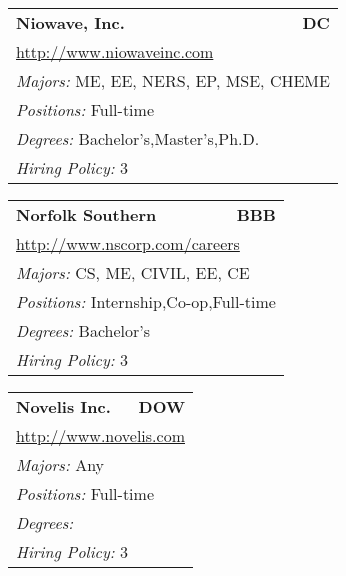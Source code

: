 \documentclass[twoside]{article}
\begin{document}
\begin{center}
\begin{multicols}{3}
\begin{FlushLeft}
\begin{minipage}{.9\columnwidth}
\end{minipage}
 
\begin{minipage}{.9\columnwidth}\begin{tabularx}{.95\columnwidth}{Xr}
                 {\Large\bf Niowave, Inc.} & {\Large\bf DC}\\
    \multicolumn{2}{p{.95\columnwidth}}{\url{http://www.niowaveinc.com}}\\
    \multicolumn{2}{p{.95\columnwidth}}{\emph{Majors:} ME, EE, NERS, EP, MSE, CHEME}\\
    \multicolumn{2}{p{.95\columnwidth}}{\emph{Positions:} Full-time}\\
    \multicolumn{2}{p{.95\columnwidth}}{\emph{Degrees:} Bachelor's,Master's,Ph.D.}\\
    \multicolumn{2}{p{.95\columnwidth}}{\emph{Hiring Policy:} 3}\\
    \end{tabularx}
    
\end{minipage}
 
\begin{minipage}{.9\columnwidth}\begin{tabularx}{.95\columnwidth}{Xr}
                 {\Large\bf Norfolk Southern} & {\Large\bf BBB}\\
    \multicolumn{2}{p{.95\columnwidth}}{\url{http://www.nscorp.com/careers}}\\
    \multicolumn{2}{p{.95\columnwidth}}{\emph{Majors:} CS, ME, CIVIL, EE, CE}\\
    \multicolumn{2}{p{.95\columnwidth}}{\emph{Positions:} Internship,Co-op,Full-time}\\
    \multicolumn{2}{p{.95\columnwidth}}{\emph{Degrees:} Bachelor's}\\
    \multicolumn{2}{p{.95\columnwidth}}{\emph{Hiring Policy:} 3}\\
    \end{tabularx}
    
\end{minipage}
 
\begin{minipage}{.9\columnwidth}\begin{tabularx}{.95\columnwidth}{Xr}
                 {\Large\bf Novelis Inc.} & {\Large\bf DOW}\\
    \multicolumn{2}{p{.95\columnwidth}}{\url{http://www.novelis.com}}\\
    \multicolumn{2}{p{.95\columnwidth}}{\emph{Majors:} Any}\\
    \multicolumn{2}{p{.95\columnwidth}}{\emph{Positions:} Full-time}\\
    \multicolumn{2}{p{.95\columnwidth}}{\emph{Degrees:} }\\
    \multicolumn{2}{p{.95\columnwidth}}{\emph{Hiring Policy:} 3}\\
    \end{tabularx}
    

\end{minipage}
\end{FlushLeft}
\end{multicols}
\end{center}
\end{document}
